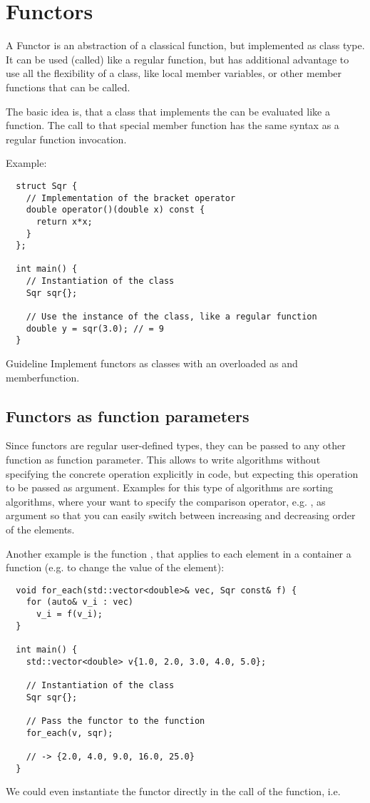 \chapter{Functors}
A Functor is an abstraction of a classical function, but implemented as class type. It can be used (called) like a regular function, but has additional
advantage to use all the flexibility of a class, like local member variables, or other member functions that can be called.

The basic idea is, that a class that implements the  can be evaluated like a function. The call to that special member function has the same
syntax as a regular function invocation.

Example:
\begin{verbatim}
  struct Sqr {
    // Implementation of the bracket operator
    double operator()(double x) const {
      return x*x;
    }
  };

  int main() {
    // Instantiation of the class
    Sqr sqr{};

    // Use the instance of the class, like a regular function
    double y = sqr(3.0); // = 9
  }
\end{verbatim}

\begin{guideline}{Guideline}
  Implement functors as classes with an overloaded  as  and  memberfunction.
\end{guideline}

\section{Functors as function parameters}
Since functors are regular user-defined types, they can be passed to any other function as function parameter. This allows to write algorithms
without specifying the concrete operation explicitly in code, but expecting this operation to be passed as argument. Examples for this type
of algorithms are sorting algorithms, where your want to specify the comparison operator, e.g. , as argument so that you
can easily switch between increasing and decreasing order of the elements.

Another example is the function , that applies to each element in a container a function (e.g. to change the value of the element):
\begin{verbatim}
  void for_each(std::vector<double>& vec, Sqr const& f) {
    for (auto& v_i : vec)
      v_i = f(v_i);
  }

  int main() {
    std::vector<double> v{1.0, 2.0, 3.0, 4.0, 5.0};

    // Instantiation of the class
    Sqr sqr{};

    // Pass the functor to the function
    for_each(v, sqr);

    // -> {2.0, 4.0, 9.0, 16.0, 25.0}
  }
\end{verbatim}
%
We could even instantiate the functor directly in the call of the  function, i.e.

